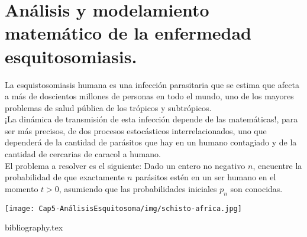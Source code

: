 \documentclass[a4paper,11pt]{book}
\begin{document}
    
    
    
    
 \chapter{Análisis y modelamiento matemático de la enfermedad esquitosomiasis.}   
La esquistosomiasis humana es una infección parasitaria que se estima que afecta a m\'as de doscientos millones de personas en todo el mundo, uno de los mayores problemas de salud pública de los trópicos y subtrópicos.\\
¡La dinámica de transmisión de esta infección depende de las matemáticas!, para ser más precisos, de dos procesos estocásticos interrelacionados, uno que dependerá de la cantidad de parásitos que hay en un humano contagiado y de la cantidad de cercarias de caracol a humano.\\
El problema a resolver es el siguiente:
Dado un entero no negativo $n$, encuentre la probabilidad de que exactamente $n$ parásitos estén en un ser humano en el momento $t>0$, asumiendo que las probabilidades iniciales $p_n$ son conocidas.
\begin{center}
\texttt{[image: Cap5-AnálisisEsquitosoma/img/schisto-africa.jpg]}
\end{center}
    
    
    
    

\backmatter

{bibliography.tex}
\end{document}

